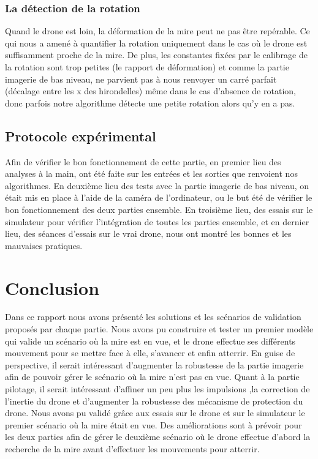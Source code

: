\documentclass[12pt]{article}
\begin{document}
\subsubsection{La détection de la rotation}
Quand le drone est loin, la déformation de la mire peut ne pas être repérable. Ce qui nous a amené à quantifier la rotation uniquement dans le cas où le drone est suffisamment proche de la mire.
De plus, les constantes fixées par le calibrage de la rotation sont trop petites (le rapport de déformation) et comme la partie imagerie de bas niveau, ne parvient pas à nous renvoyer un carré parfait (décalage entre les x des hirondelles) même dans le cas d'absence de rotation, donc parfois notre algorithme détecte une petite rotation alors qu'y en a pas. 

\subsection{Protocole expérimental}
    Afin de vérifier le bon fonctionnement de cette partie, en premier lieu des analyses à la main, ont été faite sur les entrées et les sorties que renvoient nos algorithmes. En deuxième lieu des tests avec la partie imagerie de bas niveau, on était mis en place à l'aide de la caméra de l'ordinateur, ou le but été de vérifier le bon fonctionnement des deux parties ensemble. En troisième lieu, des essais sur le simulateur pour vérifier l'intégration de toutes les parties ensemble, et en dernier lieu, des séances d'essais sur le vrai drone, nous ont montré les bonnes et les mauvaises pratiques.

\section{Conclusion}
Dans ce rapport nous avons présenté les solutions et les scénarios de validation proposés par chaque partie. Nous avons pu construire et tester un premier modèle qui valide un scénario où la mire est en vue, et le drone effectue ses différents mouvement pour se mettre face à elle, s'avancer et enfin atterrir.
En guise de perspective, il serait intéressant d'augmenter la robustesse de la partie imagerie afin de pouvoir gérer le scénario où la mire n'est pas en vue. Quant à la partie pilotage, il serait intéressant d'affiner un peu plus les impulsions ,la correction de l'inertie du drone et d'augmenter la robustesse des mécanisme de protection du drone.
Nous avons pu validé grâce aux essais sur le drone et sur le simulateur le premier scénario où la mire était en vue. Des améliorations sont à prévoir pour les deux parties afin de gérer le deuxième scénario où le drone effectue d'abord la recherche de la mire avant d'effectuer les mouvements pour atterrir.
\end{document}

